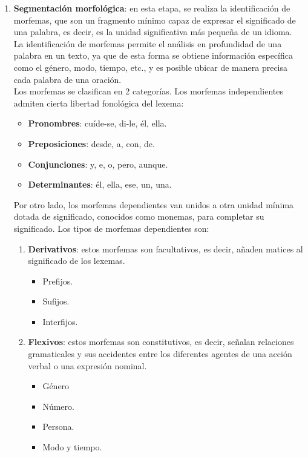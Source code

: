 \begin{enumerate}
\item \textbf{Segmentación morfológica}: en esta etapa, se realiza la identificación de morfemas, que son un fragmento mínimo capaz de expresar el significado de una palabra, es decir, es la unidad significativa más pequeña de un idioma.\\

La identificación de morfemas permite el análisis en profundidad de una palabra en un texto, ya que de esta forma se obtiene información específica como el género, modo, tiempo, etc., y es posible ubicar de manera precisa cada palabra de una oración.\\

Los morfemas se clasifican en 2 categorías. Los morfemas independientes admiten cierta libertad fonológica del lexema: 

\begin{itemize}
    \item \textbf{Pronombres}: cuíde-se, di-le, él, ella.
    \item \textbf{Preposiciones}: desde, a, con, de.
    \item \textbf{Conjunciones}: y, e, o, pero, aunque.
    \item \textbf{Determinantes}: él, ella, ese, un, una.
\end{itemize}

Por otro lado, los morfemas dependientes van unidos a otra unidad mínima dotada de significado, conocidos como monemas, para completar su significado.  Los tipos de morfemas dependientes son: 

\begin{enumerate}
    \item \textbf{Derivativos}: estos morfemas son facultativos, es decir, añaden matices al significado de los lexemas.
    \begin{itemize}
        \item Prefijos.
        \item Sufijos.
        \item Interfijos.
    \end{itemize}
    \item \textbf{Flexivos}: estos morfemas son constitutivos, es decir, señalan relaciones gramaticales y sus accidentes entre los diferentes agentes de una acción verbal o una expresión nominal.
    \begin{itemize}
        \item Género
\item Número.
\item Persona.
\item Modo y tiempo.
    \end{itemize}
\end{enumerate}


\end{enumerate}

